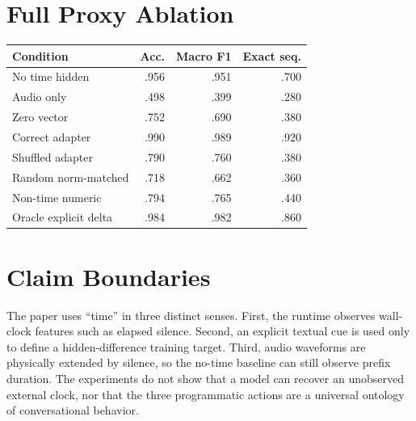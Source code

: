 \documentclass[10pt,twocolumn]{article}
\begin{document}
\noindent\begin{minipage}{\linewidth}
\section{Full Proxy Ablation}

\begin{center}
\small
\begin{tabular}{lrrr}
\toprule
Condition & Acc. & Macro F1 & Exact seq.\\
\midrule
No time hidden & .956 & .951 & .700\\
Audio only & .498 & .399 & .280\\
Zero vector & .752 & .690 & .380\\
Correct adapter & .990 & .989 & .920\\
Shuffled adapter & .790 & .760 & .380\\
Random norm-matched & .718 & .662 & .360\\
Non-time numeric & .794 & .765 & .440\\
Oracle explicit delta & .984 & .982 & .860\\
\bottomrule
\end{tabular}
\end{center}
\end{minipage}

\section{Claim Boundaries}

The paper uses ``time'' in three distinct senses. First, the runtime observes wall-clock features such as elapsed silence. Second, an explicit textual cue is used only to define a hidden-difference training target. Third, audio waveforms are physically extended by silence, so the no-time baseline can still observe prefix duration. The experiments do not show that a model can recover an unobserved external clock, nor that the three programmatic actions are a universal ontology of conversational behavior.
\end{document}
